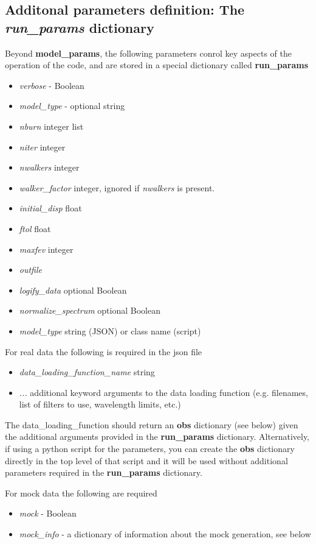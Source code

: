 \subsection{Additonal parameters definition: The \emph{run_params} dictionary}
Beyond {\bf model_params}, the following parameters conrol key aspects
of the operation of the code, and are stored in a special dictionary
called {\bf run_params}
\begin{itemize}
\item {\it verbose} - Boolean
\item {\it model_type} - optional string
\item {\it nburn} integer list
\item {\it niter} integer
\item {\it nwalkers} integer
\item {\it walker_factor} integer, ignored if {\it nwalkers} is present.
\item {\it initial_disp} float
\item {\it ftol} float
\item {\it maxfev} integer
\item {\it outfile}
\item {\it logify_data} optional Boolean
\item {\it normalize_spectrum} optional Boolean
\item {\it model_type} string (JSON) or class name (script) 
\end{itemize}

For real data the following is required in the json file
\begin{itemize}
\item {\it data_loading_function_name} string
\item {\it ...} additional keyword arguments to the data loading function
(e.g. filenames, list of filters to use, wavelength limits, etc.)
\end{itemize}

The data_loading_function should return an {\bf obs} dictionary (see
below) given the additional arguments provided in the {\bf run_params}
dictionary.  Alternatively, if using a python script for the
parameters, you can create the {\bf obs} dictionary directly in the
top level of that script and it will be used without additional
parameters required in the {\bf run_params} dictionary.

For mock data the following are required
\begin{itemize}
\item {\it mock} - Boolean
\item {\it mock_info} - a dictionary of information about the mock generation, see below
\end{itemize}


